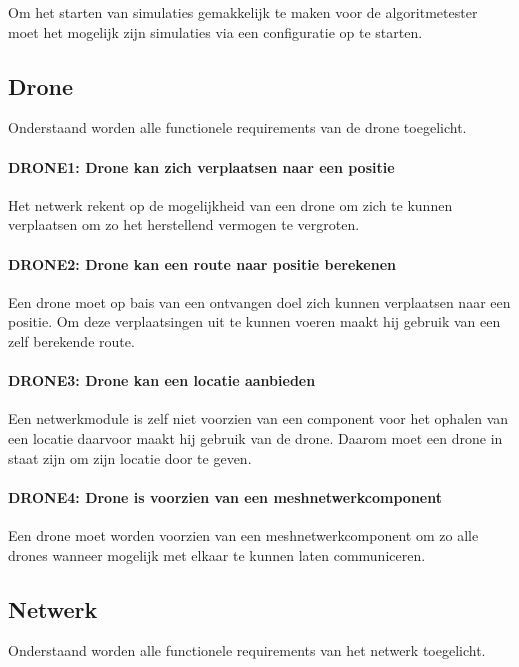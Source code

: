 \documentclass[a4paper, 11pt, oneside]{report}
\begin{document}
Om het starten van simulaties gemakkelijk te maken voor de algoritmetester moet het mogelijk zijn simulaties via een configuratie op te starten.


\subsection{Drone}
Onderstaand worden alle functionele requirements van de drone toegelicht.
\paragraph{DRONE1: Drone kan zich verplaatsen naar een positie}
\hypertarget{DRONE1}{}

Het netwerk rekent op de mogelijkheid van een drone om zich te kunnen verplaatsen om zo het herstellend vermogen te vergroten.

\paragraph{DRONE2: Drone kan een route naar positie berekenen}
\hypertarget{DRONE2}{}

Een drone moet op bais van een ontvangen doel zich kunnen verplaatsen naar een positie. Om deze verplaatsingen uit te kunnen voeren maakt hij gebruik van een zelf berekende route.

\paragraph{DRONE3: Drone kan een locatie aanbieden}
\hypertarget{DRONE3}{}

Een netwerkmodule is zelf niet voorzien van een component voor het ophalen van een locatie daarvoor maakt hij gebruik van de drone. Daarom moet een drone in staat zijn om zijn locatie door te geven.

\paragraph{DRONE4: Drone is voorzien van een meshnetwerkcomponent}
\hypertarget{DRONE4}{}

Een drone moet worden voorzien van een meshnetwerkcomponent om zo alle drones wanneer mogelijk met elkaar te kunnen laten communiceren.

\subsection{Netwerk}
Onderstaand worden alle functionele requirements van het netwerk toegelicht.
\end{document}
